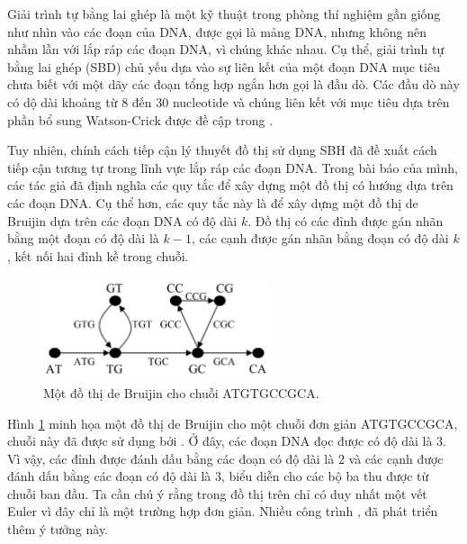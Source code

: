 \documentclass[14pt, a4paper]{article}
\numberwithin{equation}{section}
\numberwithin{figure}{section}
\numberwithin{dl}{section}
\numberwithin{md}{section}
\numberwithin{bd}{section}
\numberwithin{dn}{section}
\numberwithin{hq}{section}
\begin{document}
    Giải trình tự bằng lai ghép là một kỹ thuật trong phòng thí nghiệm gần giống như nhìn vào các đoạn của DNA,
    được gọi là mảng DNA, nhưng không nên nhầm lẫn với lắp ráp các đoạn DNA, vì chúng khác nhau.
    Cụ thể, giải trình tự bằng lai ghép (SBD) chủ yếu dựa vào sự liên kết của một đoạn DNA mục tiêu chưa biết với một dãy các đoạn tổng hợp ngắn hơn gọi là đầu dò.
    Các đầu dò này có dộ dài khoảng từ 8 đến 30 nucleotide và chúng liên kết với mục tiêu dựa trên phần bổ sung Watson-Crick được đề cập trong \cite{de1946combinatorial}.

    Tuy nhiên, chính cách tiếp cận lý thuyết đồ thị sử dụng SBH \cite{idury1995new} đã đề xuất cách tiếp cận tương tự trong lĩnh vực lắp ráp các đoạn DNA.
    Trong bài báo của mình, các tác giả đã định nghĩa các quy tắc để xây dựng một đồ thị có hướng dựa trên các đoạn DNA.
    Cụ thể hơn, các quy tắc này là để xây dựng một đồ thị de Bruijin dựa trên các đoạn DNA có độ dài $k$.
    Đồ thị có các đỉnh được gán nhãn bằng một đoạn có độ dài là $k-1$, các cạnh được gán nhãn bằng đoạn có độ dài $k$, kết nối hai đỉnh kề trong chuỗi.

    \begin{figure}[h!]
        \centering
        \includegraphics[width=0.6\textwidth]{2.png}
        \caption{Một đồ thị de Bruijin cho chuỗi ATGTGCCGCA.}
        \label{fig:2}
    \end{figure}

    Hình \ref{fig:2} minh họa một đồ thị de Bruijin cho một chuỗi đơn giản ATGTGCCGCA, chuỗi này đã được sử dụng bởi \cite{idury1995new}.
    Ở đây, các đoạn DNA đọc được có độ dài là 3.
    Vì vậy, các đỉnh được đánh dấu bằng các đoạn có độ dài là 2 và các cạnh được đánh dấu bằng các đoạn có độ dài là 3, biểu diễn cho các bộ ba thu được từ chuỗi ban đầu.
    Ta cần chú ý rằng trong đồ thị trên chỉ có duy nhất một vết Euler vì đây chỉ là một trường hợp đơn giản.
    Nhiều công trình \cite{pevzner2000computational}, \cite{pevzner1995dna} đã phát triển thêm ý tưởng này.
\end{document}
